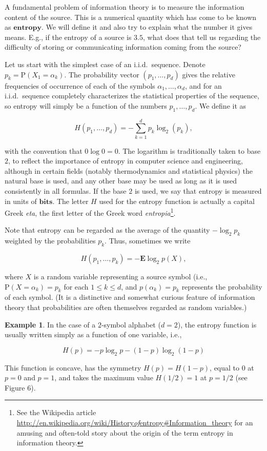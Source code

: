 \documentclass[11pt]{report}
\theoremstyle{plain}
\theoremstyle{definition}
\newtheorem{example}[thm]{Example}
\begin{document}
A fundamental problem of information theory is to
measure the information content of the source. This is
a numerical quantity which has come to be known as
$\textbf{entropy}$. We will define it and also try to
explain what the number it gives means. E.g., if the
entropy of a source is $3.5$, what does that tell us
regarding the difficulty of storing or communicating
information coming from the source?

Let us start with the simplest case of an i.i.d.\
sequence. Denote $p_k = \mathrm{P}(X_1 = \alpha_k)$.
The probability vector $(p_1,\ldots,p_d)$ gives the
relative frequencies of occurrence of each of the
symbols $\alpha_1,\ldots,\alpha_d$, and for an
i.i.d.\ sequence completely characterizes the
statistical properties of the sequence, so entropy
will simply be a function of the numbers
$p_1,\ldots,p_d$. We define it as

\[
H(p_1,\ldots,p_d) = -\sum_{k=1}^d p_k \log_2(p_k),
\]

\noindent with the convention that $0\log 0 = 0$. The logarithm
is traditionally taken to base $2$, to reflect the
importance of entropy in computer science and
engineering, although in certain fields (notably
thermodynamics and statistical physics) the natural
base is used, and any other base may be used as long
as it is used consistently in all formulas. If the
base $2$ is used, we say that entropy is measured in
units of $\textbf{bits}$. The letter $H$ used for the
entropy function is actually a capital Greek \emph{eta},
the first letter of the Greek word
\emph{entropia}\footnote{See the Wikipedia article
\href{http://en.wikipedia.org/wiki/History_of_entropy\#Information_theory}{http://en.wikipedia.org/wiki/History\emph{of}entropy\#Information\_theory}
for an amusing and often-told story about the origin
of the term entropy in information theory.}.

Note that entropy can be regarded as the average of
the quantity $-\log_2 p_k$ weighted by the
probabilities $p_k$. Thus, sometimes we write

\[
H(p_1,\ldots,p_k) = -\mathbf{E} \log_2 p(X),
\]

\noindent where $X$ is a random variable representing a source
symbol (i.e., $\mathrm{P}(X=\alpha_k)=p_k$ for each
$1\le k\le d$, and $p(\alpha_k)=p_k$ represents the
probability of each symbol. (It is a distinctive and
somewhat curious feature of information theory that
probabilities are often themselves regarded as random
variables.)

\begin{example}
In the case of a $2$-symbol alphabet ($d=2$), the
entropy function is usually written simply as a
function of one variable, i.e.,

\[
H(p) = -p\log_2 p - (1-p) \log_2 (1-p)
\]

\noindent This function is concave, has the symmetry
$H(p)=H(1-p)$, equal to $0$ at $p=0$ and $p=1$, and
takes the maximum value $H(1/2)=1$ at $p=1/2$ (see
Figure 6).
\end{example}
\end{document}
